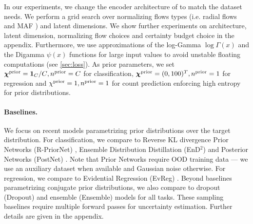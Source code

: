 In our experiments, we change the encoder architecture of \NatPNacro{} to match the dataset needs. We perform a grid search over normalizing flows types (i.e. radial flows \citep{radialflow} and MAF \citep{made,maf}) and latent dimensions. We show further experiments on architecture, latent dimension, normalizing flow choices and certainty budget choice in the appendix. Furthermore, we use approximations of the log-Gamma $\log\Gamma(x)$ and the Digamma $\psi(x)$ functions for large input values to avoid unstable floating computations (see \cref{sec:loss}). As prior parameters, we set ${\bm{\chi}^\text{prior}=\bm{1}_{C}/C}, {n^\text{prior}=C}$ for classification, ${\bm{\chi}^\text{prior}=(0, 100)^T}, n^\text{prior}=1$ for regression and $\chi^\text{prior}=1, n^\text{prior}=1$ for count prediction enforcing high entropy for prior distributions.

\paragraph{Baselines.} We focus on recent models parametrizing prior distributions over the target distribution. For classification, we compare \NatPNacro{} to Reverse KL divergence Prior Networks (R-PriorNet) \citep{reverse-kl}, Ensemble Distribution Distillation (EnD$^2$) \citep{distribution-distillation} and Posterior Networks (PostNet) \citep{charpentier2020}. Note that Prior Networks require OOD training data --- we use an auxiliary dataset when available and Gaussian noise otherwise. For regression, we compare to Evidential Regression (EvReg) \citep{evidential-regression}. Beyond baselines parametrizing conjugate prior distributions, we also compare to dropout (Dropout) \citep{dropout} and ensemble (Ensemble) \citep{ensembles} models for all tasks. These sampling baselines require multiple forward passes for uncertainty estimation. 
Further details are given in the appendix.


